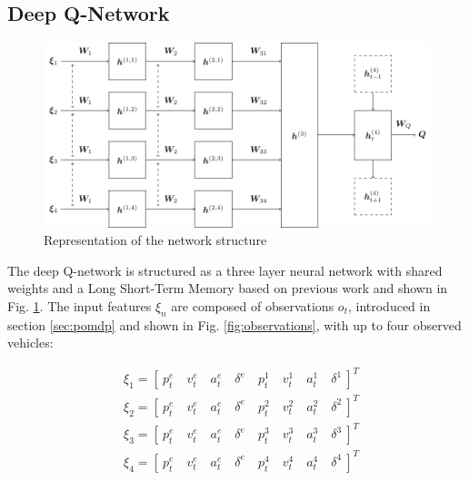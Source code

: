 \subsection{Deep Q-Network}
\begin{figure}[t]
	\centering
	\includegraphics[width=0.95\columnwidth]{figures/figures-network.pdf}
	\caption{Representation of the network structure}
	\label{fig:Network}
\end{figure}
\label{sec:q-learning}
The deep Q-network is structured as a three layer neural network with shared weights and a Long Short-Term Memory based on previous work \cite{Tram2018LearningQ-Learning} and shown in Fig. \ref{fig:Network}. The input features $\xi_n$ are composed of observations $o_t$, introduced in section \ref{sec:pomdp} and shown in Fig. \ref{fig:observations}, with up to four observed vehicles: 

\begin{equation}
	\begin{aligned}
	&\xi_1 = [\  p^e_t \quad v^e_t \quad a^e_t \quad \delta^e \quad p^1_t \quad v^1_t \quad a^1_t \quad \delta^1 \  ]^T\\
	&\xi_2 = [\  p^e_t \quad v^e_t \quad a^e_t \quad \delta^e \quad p^2_t \quad v^2_t \quad a^2_t \quad \delta^2 \  ]^T\\
	&\xi_3 = [\  p^e_t \quad v^e_t \quad a^e_t \quad \delta^e \quad p^3_t \quad v^3_t \quad a^3_t \quad \delta^3 \  ]^T\\
	&\xi_4 = [\  p^e_t \quad v^e_t \quad a^e_t \quad \delta^e \quad p^4_t \quad v^4_t \quad a^4_t \quad \delta^4 \  ]^T\\
	\end{aligned}
\end{equation}

